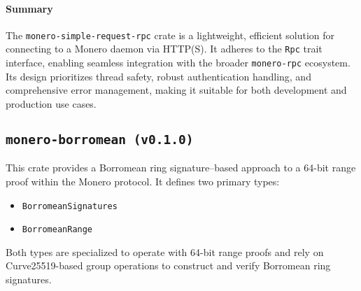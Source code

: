\paragraph{Summary}
The \texttt{monero-simple-request-rpc} crate is a lightweight, efficient solution for connecting to a Monero daemon via HTTP(S).  It adheres to the \texttt{Rpc} trait interface, enabling seamless integration with the broader \texttt{monero-rpc} ecosystem.  Its design prioritizes thread safety, robust authentication handling, and comprehensive error management, making it suitable for both development and production use cases.



\subsection{\texttt{monero-borromean (v0.1.0)}}
\label{sec:monero_borromean}

This crate provides a Borromean ring signature--based approach to a 64-bit range proof within the Monero protocol. It defines two primary types:

\begin{itemize}
  \item \texttt{BorromeanSignatures} %
  \item \texttt{BorromeanRange} %
\end{itemize}

Both types are specialized to operate with 64-bit range proofs and rely on Curve25519-based group operations to construct and verify Borromean ring signatures.

